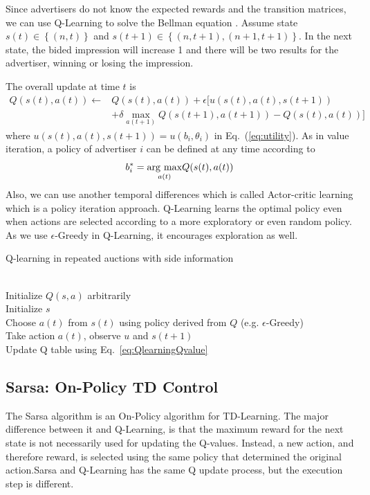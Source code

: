 Since advertisers do not know the expected rewards and the transition matrices, we can use Q-Learning to solve the Bellman equation \cite{michaelgabrieljohnmoore1991, richards.suttonandrewg.barto1998}. Assume state $s(t) \in \left \{(n,t)  \right \}$ and $s(t+1)\in \left \{(n,t+1),(n+1,t+1)  \right \}$. In the next state, the bided impression will increase 1 and there will be two results for the advertiser, winning or losing the impression. 

The overall update at time $t$ is
\begin{equation}
\label{eq:QlearningQvalue}
\begin{split}
Q(s(t),a(t)) \leftarrow & Q(s(t),a(t)) +\epsilon [u(s(t),a(t),s(t+1)) \\
&+\delta \underset{a(t+1)}\max Q(s(t+1),a(t+1))-Q(s(t),a(t))]
\end{split}
\end{equation}
where $u(s(t),a(t),s(t+1))=u(b_i,\theta_i)$ in Eq.~(\ref{eq:utility}). As in value iteration, a policy of advertiser $i$ can be defined at any time according to 
\begin{equation}
\label{eq:optimalbid}
b^{*}_{i}=\underset{a(t)}{\mathop{\rm arg~max}\limits} Q(s(t),a(t))
\end{equation}
Also, we can use another temporal differences which is called Actor-critic learning which is a policy iteration approach. Q-Learning learns the optimal policy even when actions are selected according to a more exploratory or even random policy. As we use $\epsilon$-Greedy in Q-Learning, it encourages exploration as well.
\begin{algorithm}
\caption{Q-learning in repeated auctions with side information}
\label{al:Qlearning}
\begin{algorithmic}[1]
 {}
\\Initialize $Q(s,a)$ arbitrarily
\\ \qquad Initialize $s$
\\ \qquad \qquad Choose $a(t)$ from $s(t)$ using policy derived from $Q$ (e.g. $\epsilon$-Greedy) 
\\ \qquad \qquad Take action $a(t)$, observe $u$ and $s(t+1)$
\\ \qquad \qquad Update Q table using Eq.~\ref{eq:QlearningQvalue}
\EndFor
\EndFor
\EndProcedure
\end{algorithmic}
\end{algorithm}

\subsection{Sarsa: On-Policy TD Control}
The Sarsa algorithm is an On-Policy algorithm for TD-Learning. The major difference between it and Q-Learning, is that the maximum reward for the next state is not necessarily used for updating the Q-values. Instead, a new action, and therefore reward, is selected using the same policy that determined the original action.Sarsa and Q-Learning has the same Q update process, but the execution step is different. 

